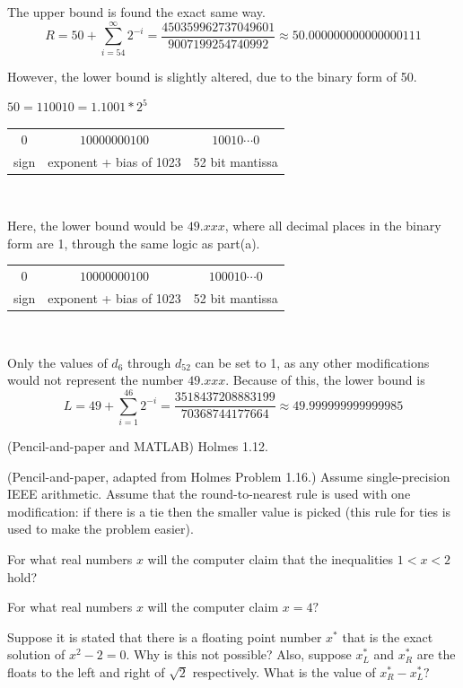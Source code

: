 	The upper bound is found the exact same way.
	$$R = 50 + \sum_{i=54}^{\infty}2^{-i} = \frac{450359962737049601}{9007199254740992} \approx 50.000000000000000111$$

	However, the lower bound is slightly altered, due to the binary form of 50.

	$50 = 110010 = 1.1001*2^5$ \\

	\begin{center}
	\begin{tabular}{c | c | c}

		$0$ & $10000000100$ & $10010\cdots0$ \\

		sign & exponent + bias of 1023 & 52 bit mantissa \\

	\end{tabular} \\
	\end{center}

	Here, the lower bound would be $49.xxx$, where all decimal places in the binary form are 1, through the same logic as part(a). \\

	\begin{center}
	\begin{tabular}{c | c | c}

		$0$ & $10000000100$ & $100010\cdots0$ \\

		sign & exponent + bias of 1023 & 52 bit mantissa \\

	\end{tabular} \\
	\end{center}

	Only the values of $d_6$ through $d_{52}$ can be set to 1, as any other modifications would not represent the number $49.xxx$.
	Because of this, the lower bound is
	$$L = 49 + \sum_{i = 1}^{46}2^{-i} = \frac{3518437208883199}{70368744177664} \approx 49.999999999999985$$

\eenum

\item (Pencil-and-paper and MATLAB)
Holmes 1.12.

\item
(Pencil-and-paper, adapted from Holmes Problem 1.16.)  Assume single-precision IEEE arithmetic. Assume that the round-to-nearest rule is used with one modification: if there is a tie then the smaller value is picked (this rule for ties is used to make the problem easier).
\benum
\item For what real numbers $x$ will the computer claim that the inequalities $1 < x < 2$ hold?
\item For what real numbers $x$ will the computer claim $x = 4?$
\item Suppose it is stated that there is a floating point number $x^*$ that is the exact solution of
$x^2-2=0.$   Why is this not possible? Also, suppose $x^*_L$ and $x^*_R$ are the floats to the left and right of $\sqrt 2$ respectively.  What is the value of $x^*_R-x^*_L?$
\eenum

